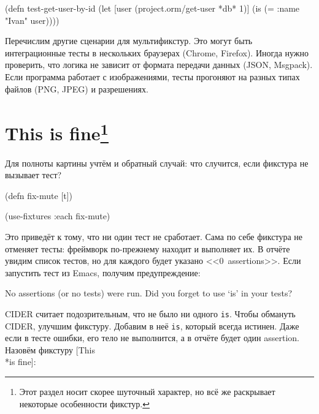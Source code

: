 \begin{english}
  \begin{clojure}
(defn test-get-user-by-id
  (let [user (project.orm/get-user *db* 1)]
    (is (= {:name "Ivan"} user))))
  \end{clojure}
\end{english}

\fi

Перечислим другие сценарии для мультификстур. Это могут быть интеграционные
тесты в нескольких браузерах (Chrome, Firefox). Иногда нужно проверить, что
логика не зависит от формата передачи данных (JSON, Msgpack). Если программа
работает с изображениями, тесты прогоняют на разных типах файлов (PNG, JPEG) и
разрешениях.

\section[This is fine]{This is fine\footnote{%
    Этот раздел носит скорее шуточный характер,
    но всё же раскрывает некоторые особенности фикстур.}}

Для полноты картины учтём и обратный случай: что случится, если фикстура не
вызывает тест?


\begin{english}
  \begin{clojure}
(defn fix-mute [t])

(use-fixtures :each fix-mute)
  \end{clojure}
\end{english}

Это приведёт к тому, что ни один тест не сработает. Сама по себе фикстура не
отменяет тесты: фреймворк по-прежнему находит и выполняет их. В отчёте увидим
список тестов, но для каждого будет указано <<0~assertions>>. Если запустить
тест из Emacs, получим предупреждение:

\begin{english}
  \begin{clojure}
No assertions (or no tests) were run.
Did you forget to use ‘is’ in your tests?
  \end{clojure}
\end{english}


CIDER считает подозрительным, что не было ни одного \verb|is|. Чтобы обмануть
CIDER, улучшим фикстуру. Добавим в неё \verb|is|, который всегда истинен. Даже
если в тесте ошибки, его тело не выполнится, а в отчёте будет один
assertion. Назовём фикстуру
[This\\*is fine]:

